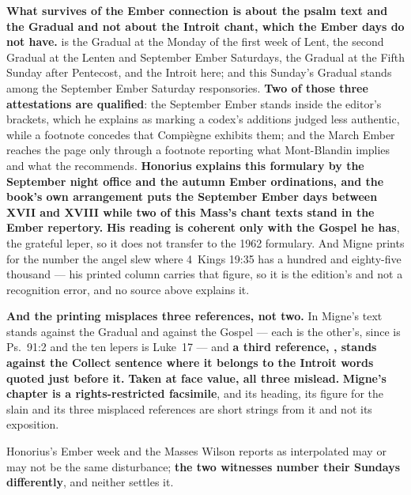 \textbf{What survives of the Ember connection is about the psalm text and the
Gradual and not about the Introit chant, which the Ember days do not have.} 
is the Gradual at the Monday of the first week of Lent, the second Gradual at
the Lenten and September Ember Saturdays, the Gradual at the Fifth Sunday after
Pentecost, and the Introit here; and this Sunday's Gradual  stands among the September Ember Saturday responsories. \textbf{Two
of those three attestations are qualified}: the September Ember  stands inside the editor's brackets, which he explains as marking a
codex's additions judged less authentic, while a footnote concedes that
Compiègne exhibits them; and the March Ember  reaches the page
only through a footnote reporting what Mont-Blandin implies and what the
 recommends. \textbf{Honorius explains this formulary by the
September night office and the autumn Ember ordinations, and the book's own
arrangement puts the September Ember days between  XVII and
XVIII while two of this Mass's chant texts stand in the Ember repertory.} \textbf{His  reading is coherent only
with the Gospel he has}, the grateful leper, so it does not transfer to the 1962
formulary. And Migne prints
 for the number the angel slew where 4~Kings
19:35 has a hundred and eighty-five thousand --- his printed column carries
that figure, so it is the edition's and not a recognition error, and no source
above explains it.

\textbf{And the printing misplaces three references, not two.} In Migne's text
 stands against the Gradual and
 against the Gospel --- each is the other's, since
 is Ps.~91:2 and the ten lepers is Luke~17 ---
and \textbf{a third reference, , stands against the
Collect sentence where it belongs to the Introit words quoted just before it.}
\textbf{Taken at face value, all three mislead.} \textbf{Migne's chapter is a rights-restricted facsimile}, and its heading, its
figure for the slain and its three misplaced references are short strings from
it and not its exposition.

Honorius's Ember week and the Masses Wilson reports as interpolated may or may
not be the same disturbance; \textbf{the two witnesses number their Sundays
differently}, and neither settles it.


